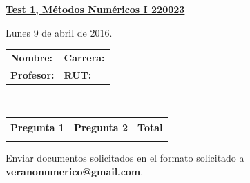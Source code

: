 \documentclass[11pt]{article}
\begin{document}
\hspace*{-1,5cm}

\vspace*{0.5cm} \centerline {\bf\underline{Test 1, M\'etodos Num\'ericos I 220023 }}
\centerline{\textrm{Lunes 9 de abril de 2016.}}  \vspace{0.2cm}


\begin{center}
 \begin{tabular}{p{}p{}}
	\textbf{Nombre:}   &\textbf{Carrera:}\\
	\textbf{Profesor:} & \textbf{ RUT:}
 \end{tabular}
 \\
 \vspace{0.2cm}
 \begin{tabular}{||p{2cm}|p{2cm}||p{2cm}||}
 \hline
 Pregunta 1 &  Pregunta 2  &     Total\\
 \hline

  \vspace{1.5cm} & &     \\
 \hline
 \end{tabular}
 \end{center}
 Enviar documentos solicitados en el formato solicitado a \textbf{veranonumerico@gmail.com}.
\end{document}
